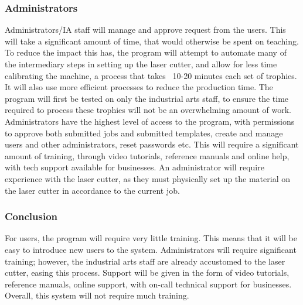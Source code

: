 \documentclass[oneside,openany,11pt,a4paper]{report}
\begin{document}
\subsubsection{Administrators}
Administrators/IA staff will manage and approve request from the users. This will take a significant amount of time, that would otherwise be spent on teaching. To reduce the impact this has, the program will attempt to automate many of the intermediary steps in setting up the laser cutter, and allow for less time calibrating the machine, a process that takes ~10-20 minutes each set of trophies. It will also use more efficient processes to reduce the production time. The program will first be tested on only the industrial arts staff, to ensure the time required to process these trophies will not be an overwhelming amount of work. Administrators have the highest level of access to the program, with permissions to approve both submitted jobs and submitted templates, create and manage users and other administrators, reset passwords etc. This will require a significant amount of training, through video tutorials, reference manuals and online help, with tech support available for businesses. An administrator will require experience with the laser cutter, as they must physically set up the material on the laser cutter in accordance to the current job.
\subsubsection{Conclusion}
For users, the program will require very little training. This means that it will be easy to introduce new users to the system. Administrators will require significant training; however, the industrial arts staff are already accustomed to the laser cutter, easing this process. Support will be given in the form of video tutorials, reference manuals, online support, with on-call technical support for businesses. Overall, this system will not require much training.
\end{document}
